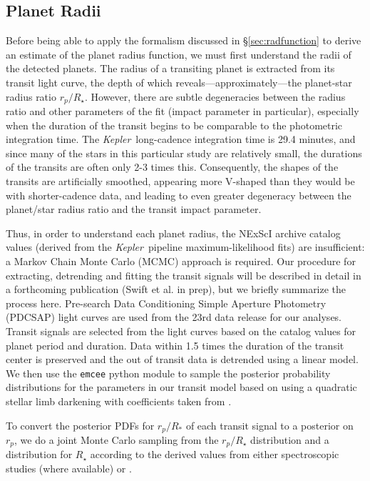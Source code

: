 \documentclass[iop]{emulateapj}
\def\Kepler{\textit{Kepler}}
\begin{document}
\subsection{Planet Radii}
\label{sec:radii}
Before being able to apply the formalism discussed in \S\ref{sec:radfunction} to derive an estimate of the planet radius function, we must first understand the radii of the detected planets.  The radius of a transiting planet is extracted from its transit light curve, the depth of which reveals---approximately---the planet-star radius ratio $r_p/R_\star$.  However, there are subtle degeneracies between the radius ratio and other parameters of the fit (impact parameter in particular), especially when the duration of the transit begins to be comparable to the photometric integration time.   The \Kepler\ long-cadence integration time is 29.4 minutes, and since many of the stars in this particular study are relatively small, the durations of the transits are often only 2-3 times this.  Consequently, the shapes of the transits are artificially smoothed, appearing more V-shaped than they would be with shorter-cadence data, and leading to even greater degeneracy between the planet/star radius ratio and the transit impact parameter.



Thus, in order to understand each planet radius, the NExScI archive catalog values (derived from the \Kepler\ pipeline maximum-likelihood fits) are insufficient: a Markov Chain Monte Carlo (MCMC) approach is required.  Our procedure for extracting, detrending and fitting the transit signals will be described in detail in a forthcoming publication (Swift et al. in prep), but we briefly summarize the process here. Pre-search Data Conditioning Simple Aperture Photometry (PDCSAP) light curves are used from the 23rd data release for our analyses. Transit signals are selected from the light curves based on the catalog values for planet period and duration. Data within 1.5 times the duration of the transit center is preserved and the out of transit data is detrended using a linear model. We then use the \texttt{emcee} python module \citep{emcee} to sample the posterior probability distributions for the parameters in our transit model based on \citet{ma02} using a quadratic stellar limb darkening with coefficients taken from \citet{claret2012}.


To convert the posterior PDFs for $r_p/R_*$ of each transit signal to a posterior on $r_p$, we do a joint Monte Carlo sampling from the $r_p/R_\star$ distribution and a distribution for $R_\star$ according to the derived values from either spectroscopic studies (where available) or \citet{dressing2013}.  
\end{document}
